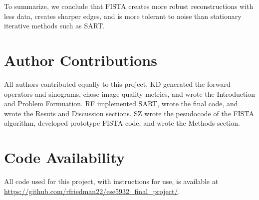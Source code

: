 \documentclass[12pt]{article}
\newcommand{\noin}{\noindent}
\begin{document}
\vspace{0.2in}

\noin To summarize, we conclude that FISTA creates more robust reconstructions with less data, creates sharper edges, and is more tolerant to noise than stationary iterative methods such as SART.

\section{Author Contributions}
\noin All authors contributed equally to this project. KD generated the forward operators and sinograms, chose image quality metrics, and wrote the Introduction and Problem Formuation. RF implemented SART, wrote the final code, and wrote the Resuts and Discussion sections. SZ wrote the pesudocode of the FISTA algorithm, developed prototype FISTA code, and wrote the Methods section.

\section{Code Availability}
\noin All code used for this project, with instructions for use, is available at \url{https://github.com/rfriedman22/ese5932_final_project/}.
\end{document}
